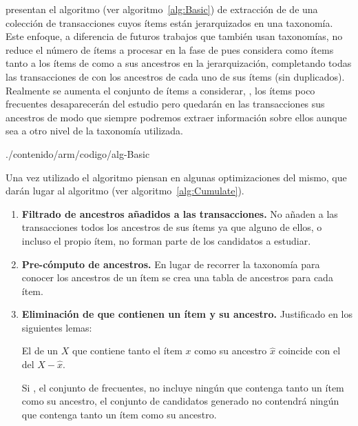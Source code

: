 \citet{SrikantAgrawal-MiningGeneralizedAR-1997} presentan el algoritmo  (ver algoritmo~\ref{alg:Basic}) de extracción de \ars de una colección de transacciones cuyos ítems están jerarquizados en una taxonomía. Este enfoque, a diferencia de futuros trabajos que también usan taxonomías, no reduce el número de ítems a procesar en la fase de \FIM pues considera como ítems tanto a los ítems de \D como a sus ancestros en la jerarquización, completando todas las transacciones de \D con los ancestros de cada uno de sus ítems (sin duplicados). Realmente se aumenta el conjunto de ítems a considerar, \I, los ítems poco frecuentes desaparecerán del estudio pero quedarán en las transacciones sus ancestros de modo que siempre podremos extraer información sobre ellos aunque sea a otro nivel de la taxonomía utilizada.


                 {./contenido/arm/codigo/alg-Basic}

Una vez utilizado el algoritmo  piensan en algunas optimizaciones del mismo, que darán lugar al algoritmo  (ver algoritmo~\ref{alg:Cumulate}).

\begin{enumerate}
  \item \textbf{Filtrado de ancestros añadidos a las transacciones.} No añaden a las transacciones todos los ancestros de sus ítems ya que alguno de ellos, o incluso el propio ítem, no forman parte de los candidatos a estudiar.
  \item \textbf{Pre-cómputo de ancestros.} En lugar de recorrer la taxonomía para conocer los ancestros de un ítem se crea una tabla de ancestros para cada ítem.
  \item \textbf{Eliminación de \itemsets que contienen un ítem y su ancestro.} Justificado en los siguientes lemas:
    \begin{Lemma}
      El \soporte de un \itemset $X$ que contiene tanto el ítem $x$ como su ancestro $\hat{x}$ coincide con el \soporte del \itemset $X-\hat{x}$.
    \end{Lemma}
    \begin{Lemma}
      Si \aprioriL[k], el conjunto de \kitemsets frecuentes, no incluye ningún \itemset que contenga tanto un ítem como su ancestro, el conjunto de candidatos \aprioriC[k+1] generado no contendrá ningún \itemset que contenga tanto un ítem como su ancestro.
    \end{Lemma}
\end{enumerate}

